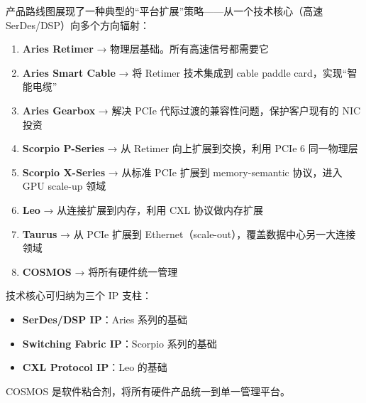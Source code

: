 产品路线图展现了一种典型的``平台扩展''策略——从一个技术核心（高速 SerDes/DSP）向多个方向辐射：

\begin{enumerate}
    \item \textbf{Aries Retimer} → 物理层基础。所有高速信号都需要它
    \item \textbf{Aries Smart Cable} → 将 Retimer 技术集成到 cable paddle card，实现``智能电缆''
    \item \textbf{Aries Gearbox} → 解决 PCIe 代际过渡的兼容性问题，保护客户现有的 NIC 投资
    \item \textbf{Scorpio P-Series} → 从 Retimer 向上扩展到交换，利用 PCIe 6 同一物理层
    \item \textbf{Scorpio X-Series} → 从标准 PCIe 扩展到 memory-semantic 协议，进入 GPU scale-up 领域
    \item \textbf{Leo} → 从连接扩展到内存，利用 CXL 协议做内存扩展
    \item \textbf{Taurus} → 从 PCIe 扩展到 Ethernet（scale-out），覆盖数据中心另一大连接领域
    \item \textbf{COSMOS} → 将所有硬件统一管理
\end{enumerate}

技术核心可归纳为三个 IP 支柱：
\begin{itemize}
    \item \textbf{SerDes/DSP IP}：Aries 系列的基础
    \item \textbf{Switching Fabric IP}：Scorpio 系列的基础
    \item \textbf{CXL Protocol IP}：Leo 的基础
\end{itemize}
COSMOS 是软件粘合剂，将所有硬件产品统一到单一管理平台。

